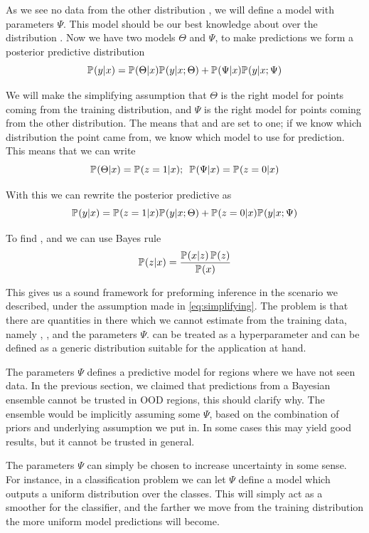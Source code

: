\documentclass[../main.tex]{subfiles}
\begin{document}
As we see no data from the other distribution , we will define a model with parameters $\Psi$. This model should be our best knowledge about  over the distribution . 
Now we have two models $\Theta$ and $\Psi$, to make predictions we form a posterior predictive distribution
$$
    \mathbb{P}_{}(y|x) = \mathbb{P}_{}(\Theta|x) \mathbb{P}_{}(y| x; \Theta) + \mathbb{P}_{}(\Psi|x) \mathbb{P}_{}(y | x; \Psi)
$$

We will make the simplifying assumption that $\Theta$ is the right model for points coming from the training distribution, and $\Psi$ is the right model for points coming from the other distribution. The means that  and  are set to one; if we know which distribution the point came from, we know which model to use for prediction. This means that we can write
\begin{equation}
    \label{eq:simplifying}
    \mathbb{P}_{}(\Theta|x) = \mathbb{P}_{}(z=1|x) ;\,\,\, \mathbb{P}_{}(\Psi|x) = \mathbb{P}_{}(z=0|x)
\end{equation}{}

With this we can rewrite the posterior predictive as
\begin{equation}
    \label{eq:final_posterior}
    \mathbb{P}_{}(y|x) = \mathbb{P}_{}(z=1|x) \mathbb{P}_{}(y| x; \Theta) + \mathbb{P}_{}(z=0|x) \mathbb{P}_{}(y | x; \Psi)
\end{equation}{}

To find , and we can use Bayes rule
$$ 
    \mathbb{P}_{}(z|x) = \frac{\mathbb{P}_{}(x|z) \, \mathbb{P}_{}(z)}{\mathbb{P}_{}(x)}
$$

This gives us a sound framework for preforming inference in the scenario we described, under the assumption made in \cref{eq:simplifying}. The problem is that there are quantities in there which we cannot estimate from the training data, namely , , and the parameters $\Psi$.  can be treated as a hyperparameter and  can be defined as a generic distribution suitable for the application at hand.

The parameters $\Psi$ defines a predictive model for regions where we have not seen data. In the previous section, we claimed that predictions from a Bayesian ensemble cannot be trusted in OOD regions, this should clarify why. The ensemble would be implicitly assuming some $\Psi$, based on the combination of priors and underlying assumption we put in. In some cases this may yield good results, but it cannot be trusted in general. 

The parameters $\Psi$ can simply be chosen to increase uncertainty in some sense. For instance, in a classification problem we can let $\Psi$ define a model which outputs a uniform distribution over the classes. This will simply act as a smoother for the classifier, and the farther we move from the training distribution the more uniform model predictions will become. 
\end{document}
